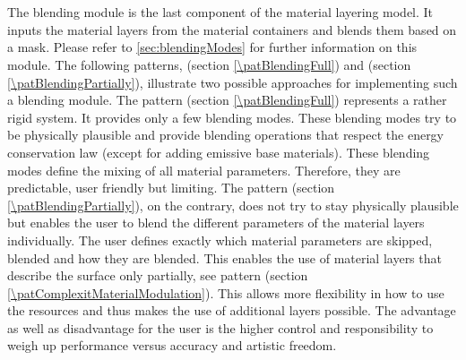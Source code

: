 \section{\patCatBlendingModule}\label{\patCatBlendingModule}

The blending module is the last component of the material layering model. It inputs the material layers from the material containers and blends them based on a mask. Please refer to \ref{sec:blendingModes} for further information on this module. The following patterns, \emph{\patBlendingFull} (section \ref{\patBlendingFull}) and \emph{\patBlendingPartially} (section \ref{\patBlendingPartially}), illustrate two possible approaches for implementing such a blending module.  The pattern \emph{\patBlendingFull} (section \ref{\patBlendingFull}) represents a rather rigid system. It provides only a few blending modes. These blending modes try to be physically plausible and provide blending operations that respect the energy conservation law (except for adding emissive base materials). These blending modes define the mixing of all material parameters. Therefore, they are predictable, user friendly but limiting.  
The pattern \emph{\patBlendingPartially} (section \ref{\patBlendingPartially}), on the contrary, does not try to stay physically plausible but enables the user to blend the different parameters of the material layers individually. The user defines exactly which material parameters are skipped, blended and how they are blended. This enables the use of material layers that describe the surface only partially, see pattern \emph{\patComplexitMaterialModulation} (section \ref{\patComplexitMaterialModulation}). This allows more flexibility in how to use the resources and thus makes the use of additional layers possible. The advantage as well as disadvantage for the user is the higher control and responsibility to weigh up performance versus accuracy and artistic freedom.  

